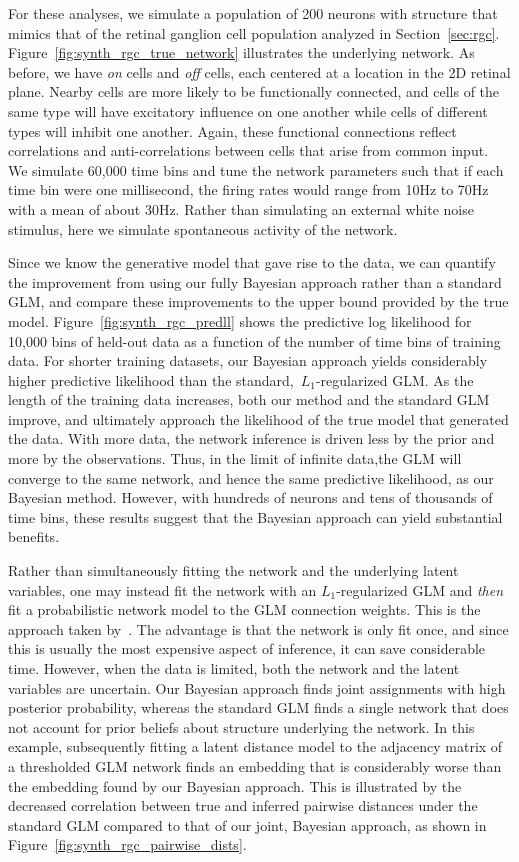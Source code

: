 For these analyses, we simulate a population of 200 neurons with
structure that mimics that of the retinal ganglion cell population
analyzed in Section~\ref{sec:rgc}. Figure~\ref{fig:synth_rgc_true_network}
illustrates the underlying network. As before, we have \textit{on}
cells and \textit{off} cells, each centered at a location in the 2D
retinal plane. Nearby cells are more likely to be functionally
connected, and cells of the same type will have excitatory influence
on one another while cells of different types will inhibit one
another. Again, these functional connections reflect correlations and
anti-correlations between cells that arise from common input. We
simulate 60,000 time bins and tune the network parameters such that if
each time bin were one millisecond, the firing rates would range from 10Hz to
70Hz with a mean of about 30Hz.  Rather than simulating an
external white noise stimulus, here we simulate spontaneous activity
of the network.

Since we know the generative model that gave rise to the data, we can
quantify the improvement from using our fully Bayesian approach
rather than a standard GLM, and compare these improvements to the
upper bound provided by the true model. Figure~\ref{fig:synth_rgc_predll}
shows the predictive log likelihood for 10,000 bins of held-out data as
a function of the number of time bins of training data. For shorter
training datasets, our Bayesian approach yields considerably higher
predictive likelihood than the standard,~$L_1$-regularized GLM. As
the length of the training data increases, both our method and
the standard GLM improve, and ultimately approach the likelihood of
the true model that generated the data. With more data, the network
inference is driven less by the prior and more by the observations.
Thus, in the limit of infinite data,the GLM will converge to the same
network, and hence the same predictive likelihood, as our Bayesian method.
However, with hundreds of neurons and tens of thousands of time bins,
these results suggest that the Bayesian approach can yield substantial
benefits.

Rather than simultaneously fitting the network and the underlying
latent variables, one may instead fit the network with an
$L_1$-regularized GLM and \textit{then} fit a probabilistic network
model to the GLM connection weights. This is the approach taken
by~\citet{stevenson2009bayesian}.  The advantage is that the network
is only fit once, and since this is usually the most expensive aspect
of inference, it can save considerable time. However, when the data is
limited, both the network and the latent variables are uncertain.  Our
Bayesian approach finds joint assignments with high posterior
probability, whereas the standard GLM finds a single network that does
not account for prior beliefs about structure underlying the network.
In this example, subsequently fitting a latent distance model to the
adjacency matrix of a thresholded GLM network finds an embedding that
is considerably worse than the embedding found by our Bayesian
approach. This is illustrated by the decreased correlation between
true and inferred pairwise distances under the standard GLM compared
to that of our joint, Bayesian approach, as shown in
Figure~\ref{fig:synth_rgc_pairwise_dists}.


